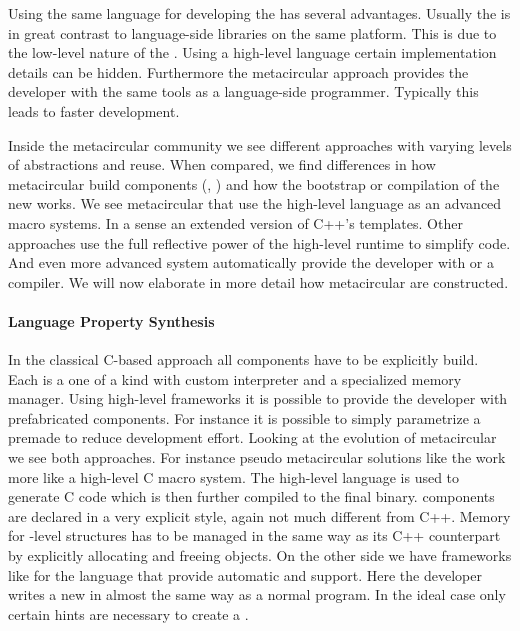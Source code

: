 \noindent Using the same language for developing the \VM has several advantages.
Usually the \VM is in great contrast to language-side libraries on the same platform.
This is due to the low-level nature of the \VM.
Using a high-level language certain implementation details can be hidden.
Furthermore the metacircular approach provides the \VM developer with the same tools as a language-side programmer.
Typically this leads to faster development.


Inside the metacircular \VM community we see different approaches with varying levels of abstractions and reuse.
When compared, we find differences in how metacircular \VMs build \VM components (\GC, \JIT) and how the bootstrap or compilation of the new \VM works.
We see metacircular \VMs that use the high-level language as an advanced macro systems.
In a sense an extended version of C++'s templates.
Other approaches use the full reflective power of the high-level runtime to simplify code.
And even more advanced system automatically provide the \VM developer with \GC or a \JIT compiler.
We will now elaborate in more detail how metacircular \VMs are constructed.


\paragraph{Language Property Synthesis}
In the classical C-based \VM approach all \VM components have to be explicitly build.
Each \VM is a one of a kind with custom interpreter and a specialized memory manager.
Using high-level \VM frameworks it is possible to provide the \VM developer with prefabricated components.
For instance it is possible to simply parametrize a premade \GC to reduce development effort.
Looking at the evolution of metacircular \VMs we see both approaches.
For instance pseudo metacircular solutions like the \Squeak \VM \cite{Inga97a} work more like a high-level C macro system.
The high-level language is used to generate C code which is then further compiled to the final \VM binary.
\VM components are declared in a very explicit style, again not much different from C++.
Memory for \VM-level structures has to be managed in the same way as its C++ counterpart by explicitly allocating and freeing objects.
On the other side we have \VM frameworks like \PyPy for the \Python language that provide automatic \GC and \JIT support.
Here the developer writes a new \VM in almost the same way as a normal \Python program.
In the ideal case only certain hints are necessary to create a \JIT.

